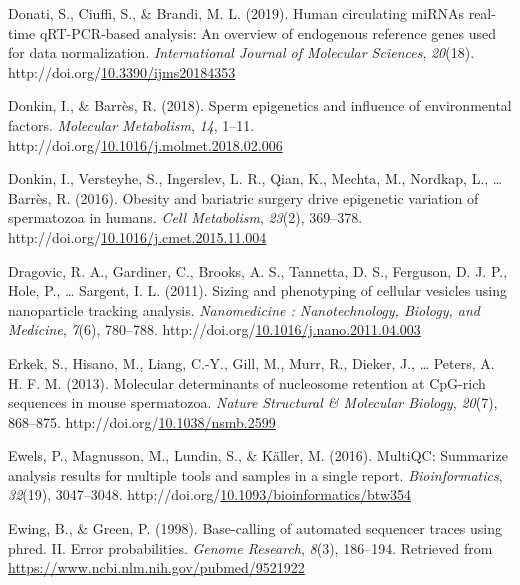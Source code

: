 \documentclass[12pt,twoside]{reedthesis}
\newlength{\cslhangindent}
\newenvironment{CSLReferences}[2] %
 {%
  \setlength{\parindent}{0pt}
  \ifodd #1 \everypar{\setlength{\hangindent}{\cslhangindent}}\ignorespaces\fi
  \ifnum #2 > 0
  \setlength{\parskip}{#2\baselineskip}
  \fi
 }%
 {}
\begin{document}
\begin{CSLReferences}{1}{0}
\leavevmode{}%
Donati, S., Ciuffi, S., \& Brandi, M. L. (2019). Human circulating miRNAs real-time qRT-PCR-based analysis: An overview of endogenous reference genes used for data normalization. \emph{International Journal of Molecular Sciences}, \emph{20}(18). http://doi.org/\href{https://doi.org/10.3390/ijms20184353}{10.3390/ijms20184353}

\leavevmode{}%
Donkin, I., \& Barrès, R. (2018). Sperm epigenetics and influence of environmental factors. \emph{Molecular Metabolism}, \emph{14}, 1--11. http://doi.org/\href{https://doi.org/10.1016/j.molmet.2018.02.006}{10.1016/j.molmet.2018.02.006}

\leavevmode{}%
Donkin, I., Versteyhe, S., Ingerslev, L. R., Qian, K., Mechta, M., Nordkap, L., \ldots{} Barrès, R. (2016). Obesity and bariatric surgery drive epigenetic variation of spermatozoa in humans. \emph{Cell Metabolism}, \emph{23}(2), 369--378. http://doi.org/\href{https://doi.org/10.1016/j.cmet.2015.11.004}{10.1016/j.cmet.2015.11.004}

\leavevmode{}%
Dragovic, R. A., Gardiner, C., Brooks, A. S., Tannetta, D. S., Ferguson, D. J. P., Hole, P., \ldots{} Sargent, I. L. (2011). Sizing and phenotyping of cellular vesicles using nanoparticle tracking analysis. \emph{Nanomedicine : Nanotechnology, Biology, and Medicine}, \emph{7}(6), 780--788. http://doi.org/\href{https://doi.org/10.1016/j.nano.2011.04.003}{10.1016/j.nano.2011.04.003}

\leavevmode{}%
Erkek, S., Hisano, M., Liang, C.-Y., Gill, M., Murr, R., Dieker, J., \ldots{} Peters, A. H. F. M. (2013). Molecular determinants of nucleosome retention at CpG-rich sequences in mouse spermatozoa. \emph{Nature Structural \& Molecular Biology}, \emph{20}(7), 868--875. http://doi.org/\href{https://doi.org/10.1038/nsmb.2599}{10.1038/nsmb.2599}

\leavevmode{}%
Ewels, P., Magnusson, M., Lundin, S., \& Käller, M. (2016). MultiQC: Summarize analysis results for multiple tools and samples in a single report. \emph{Bioinformatics}, \emph{32}(19), 3047--3048. http://doi.org/\href{https://doi.org/10.1093/bioinformatics/btw354}{10.1093/bioinformatics/btw354}

\leavevmode{}%
Ewing, B., \& Green, P. (1998). Base-calling of automated sequencer traces using phred. II. Error probabilities. \emph{Genome Research}, \emph{8}(3), 186--194. Retrieved from \url{https://www.ncbi.nlm.nih.gov/pubmed/9521922}


\end{CSLReferences}
\end{document}
